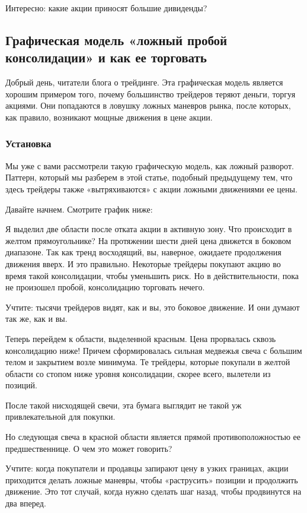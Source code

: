 \documentclass{book}
\begin{document}
Интересно: какие акции приносят большие дивиденды?

\subsection{Графическая модель «ложный пробой консолидации» и как ее
  торговать}

Добрый день, читатели блога о трейдинге. Эта графическая модель
является хорошим примером того, почему большинство трейдеров теряют
деньги, торгуя акциями. Они попадаются в ловушку ложных маневров
рынка, после которых, как правило, возникают мощные движения в цене
акции.

\subsubsection{Установка}

Мы уже с вами рассмотрели такую графическую модель, как ложный разворот. Паттерн, который мы разберем в этой статье, подобный предыдущему тем, что здесь трейдеры также «вытряхиваются» с акции ложными движениями ее цены.

Давайте начнем. Смотрите график ниже:

Я выделил две области после отката акции в активную зону. Что происходит в желтом прямоугольнике? На протяжении шести дней цена движется в боковом диапазоне. Так как тренд восходящий, вы, наверное, ожидаете продолжения движения вверх. И это правильно. Некоторые трейдеры покупают акцию во время такой консолидации, чтобы уменьшить риск. Но в действительности, пока не произошел пробой, консолидацию торговать нечего.

Учтите: тысячи трейдеров видят, как и вы, это боковое движение. И они думают так же, как и вы.

Теперь перейдем к области, выделенной красным. Цена прорвалась сквозь консолидацию ниже! Причем сформировалась сильная медвежья свеча с большим телом и закрытием возле минимума. Те трейдеры, которые покупали в желтой области со стопом ниже уровня консолидации, скорее всего, вылетели из позиций.

После такой нисходящей свечи, эта бумага выглядит не такой уж привлекательной для покупки.

Но следующая свеча в красной области является прямой противоположностью ее предшественнице. О чем это может говорить?

Учтите: когда покупатели и продавцы запирают цену в узких границах,
акции приходится делать ложные маневры, чтобы «раструсить» позиции и
продолжить движение. Это тот случай, когда нужно сделать шаг назад,
чтобы продвинутся на два вперед.
\end{document}
